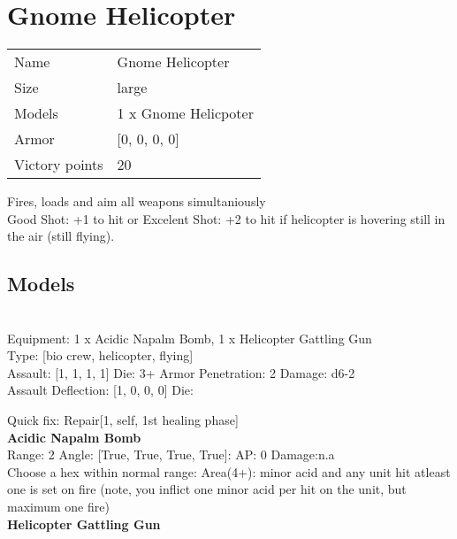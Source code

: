 \pagebreak

\section{ Gnome Helicopter }

\begin{tabular}{ll}
  Name & Gnome Helicopter \\
  Size & large\\
  Models & 1 x Gnome Helicpoter\\
  Armor & [0, 0, 0, 0]\\
  Victory points & 20\\
\end{tabular}

Fires, loads and aim all weapons simultaniously\\ 
Good Shot: +1 to hit or Excelent Shot: +2 to hit if helicopter is hovering still in the air (still flying).\\ 


\subsection{ Models }

 \\
Equipment: 1 x Acidic Napalm Bomb, 1 x Helicopter Gattling Gun \\
Type: [bio crew, helicopter, flying] \\

Assault: [1, 1, 1, 1] Die: 3+ Armor Penetration: 2 Damage: d6-2 \\
Assault Deflection: [1, 0, 0, 0] Die: \\
\indent  

Quick fix: Repair[1, self, 1st healing phase]\\ 


{\bf Acidic Napalm Bomb } \\



Range: 2  Angle: [True, True, True, True]: AP: 0 Damage:n.a \\
Choose a hex within normal range: Area(4+): minor acid and any unit hit atleast one is set on fire (note, you inflict one minor acid per hit on the unit, but maximum one fire)\\ 




{\bf Helicopter Gattling Gun } \\



